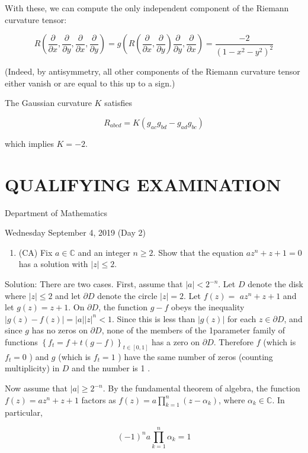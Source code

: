 \documentclass[10pt]{article}
\begin{document}
With these, we can compute the only independent component of the Riemann curvature tensor:

$$
R\left(\frac{\partial}{\partial x}, \frac{\partial}{\partial y}, \frac{\partial}{\partial x}, \frac{\partial}{\partial y}\right)=g\left(R\left(\frac{\partial}{\partial x}, \frac{\partial}{\partial y}\right) \frac{\partial}{\partial y}, \frac{\partial}{\partial x}\right)=\frac{-2}{\left(1-x^{2}-y^{2}\right)^{2}}
$$

(Indeed, by antisymmetry, all other components of the Riemann curvature tensor either vanish or are equal to this up to a sign.)

The Gaussian curvature $K$ satisfies

$$
R_{a b c d}=K\left(g_{a c} g_{b d}-g_{a d} g_{b c}\right)
$$

which implies $K=-2$.

\section*{QUALIFYING EXAMINATION }
Department of Mathematics

Wednesday September 4, 2019 (Day 2)

\begin{enumerate}
  \item (CA) Fix $a \in \mathbb{C}$ and an integer $n \geq 2$. Show that the equation $a z^{n}+z+1=0$ has a solution with $|z| \leq 2$.
\end{enumerate}

Solution: There are two cases. First, assume that $|a|<2^{-n}$. Let $D$ denote the disk where $|z| \leq 2$ and let $\partial D$ denote the circle $|z|=2$. Let $f(z)=$ $a z^{n}+z+1$ and let $g(z)=z+1$. On $\partial D$, the function $g-f$ obeys the inequality $|g(z)-f(z)|=|a||z|^{n}<1$. Since this is less than $|g(z)|$ for each $z \in \partial D$, and since $g$ has no zeros on $\partial D$, none of the members of the 1parameter family of functions $\left\{f_{t}=f+t(g-f)\right\}_{t \in[0,1]}$ has a zero on $\partial D$. Therefore $f$ (which is $f_{t}=0$ ) and $g$ (which is $f_{t}=1$ ) have the same number of zeros (counting multiplicity) in $D$ and the number is 1 .

Now assume that $|a| \geq 2^{-n}$. By the fundamental theorem of algebra, the function $f(z)=a z^{n}+z+1$ factors as $f(z)=a \prod_{k=1}^{n}\left(z-\alpha_{k}\right)$, where $\alpha_{k} \in \mathbb{C}$. In particular,

$$
(-1)^{n} a \prod_{k=1}^{n} \alpha_{k}=1
$$
\end{document}
